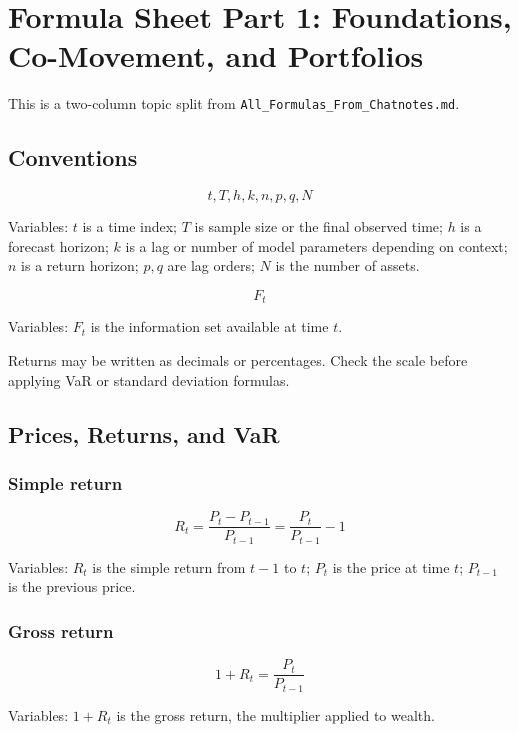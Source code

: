 \documentclass[
  8pt,
  twocolumn]{extarticle}
\author{}
\date{}
\begin{document}
\section{Formula Sheet Part 1: Foundations, Co-Movement, and
Portfolios}\label{formula-sheet-part-1-foundations-co-movement-and-portfolios}

This is a two-column topic split from
\texttt{All\_Formulas\_From\_Chatnotes.md}.

\subsection{Conventions}\label{conventions}

\[
t,T,h,k,n,p,q,N
\]

Variables: \(t\) is a time index; \(T\) is sample size or the final
observed time; \(h\) is a forecast horizon; \(k\) is a lag or number of
model parameters depending on context; \(n\) is a return horizon;
\(p,q\) are lag orders; \(N\) is the number of assets.

\[
F_t
\]

Variables: \(F_t\) is the information set available at time \(t\).

Returns may be written as decimals or percentages. Check the scale
before applying VaR or standard deviation formulas.

\subsection{Prices, Returns, and VaR}\label{prices-returns-and-var}

\subsubsection{Simple return}\label{simple-return}

\[
R_t=\frac{P_t-P_{t-1}}{P_{t-1}}=\frac{P_t}{P_{t-1}}-1
\]

Variables: \(R_t\) is the simple return from \(t-1\) to \(t\); \(P_t\)
is the price at time \(t\); \(P_{t-1}\) is the previous price.

\subsubsection{Gross return}\label{gross-return}

\[
1+R_t=\frac{P_t}{P_{t-1}}
\]

Variables: \(1+R_t\) is the gross return, the multiplier applied to
wealth.
\end{document}
